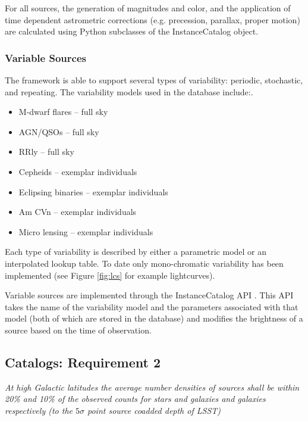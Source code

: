 \documentclass[]{article}
\begin{document}
For all sources, the generation of magnitudes and color, and the
application of time dependent astrometric corrections (e.g.
precession, parallax, proper motion) are calculated using Python
subclasses of the InstanceCatalog object.

\subsubsection{Variable Sources}
The framework is able to support several types of variability:
periodic, stochastic, and repeating.
The variability models used in the database include:.  
\begin{itemize}
\item M-dwarf flares -- full sky
\item AGN/QSOs -- full sky
\item RRly -- full sky
\item Cepheids -- exemplar individuals
\item Eclipsing binaries -- exemplar individuals
\item Am CVn -- exemplar individuals
\item Micro lensing -- exemplar individuals
\end{itemize}
Each type of variability is described by either a parametric model or
an interpolated lookup table.  To date only mono-chromatic variability
has been implemented (see Figure \ref{fig:lcs} for example lightcurves).

Variable sources are implemented through the InstanceCatalog API
\citep{XXX}. This API takes the name of the variability model and the
parameters associated with that model (both of which are stored in the
database) and modifies the brightness of a source based on the time of
observation.

\subsection{Catalogs: Requirement 2}

{\it At high Galactic latitudes the average number densities of
  sources shall be within 20\% and 10\% of the observed counts for
  stars and galaxies and galaxies respectively (to the $5\sigma$ point
  source coadded depth of LSST)} \\

\end{document}
